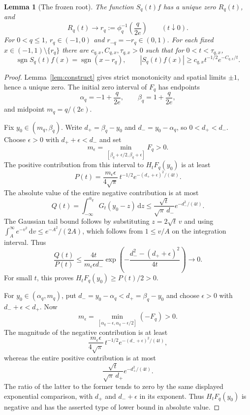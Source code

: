 \documentclass[11pt,reqno]{amsart}
\numberwithin{equation}{section}
\newtheorem{lemma}[theorem]{Lemma}
\theoremstyle{definition}
\theoremstyle{remark}
\newcommand{\sgn}{\operatorname{sgn}}
\newcommand{\dd}{\,\mathrm d}
\begin{document}
\begin{lemma}[The frozen root]\label{lem:frozen}
The function $S_q(t)f$ has a unique zero $R_q(t)$, and
\begin{equation}\label{eq:rootlimit}
 R_q(t)\longrightarrow r_q:=\phi_q^{-1}\left(\frac{q}{2e}\right)
 \qquad(t\downarrow0).
\end{equation}
For $0<q\leq1$, $r_q\in(-1,0)$ and $r_{-q}=-r_q\in(0,1)$. For each fixed $x\in(-1,1)\setminus\{r_q\}$ there are $c_{q,x},C_{q,x},\tau_{q,x}>0$ such that for $0<t<\tau_{q,x}$,
\begin{equation}\label{eq:signal}
 \sgn S_q(t)f(x)=\sgn(x-r_q),\qquad
 |S_q(t)f(x)|\geq c_{q,x}t^{-1/2}e^{-C_{q,x}/t}.
\end{equation}
\end{lemma}
\begin{proof}
Lemma~\ref{lem:construct} gives strict monotonicity and spatial limits $\pm1$, hence a unique zero. The initial zero interval of $F_q$ has endpoints
\[
 \alpha_q=-1+\frac q{2e},\qquad
 \beta_q=1+\frac q{2e},
\]
and midpoint $m_q=q/(2e)$.

Fix $y_0\in(m_q,\beta_q)$. Write $d_+=\beta_q-y_0$ and $d_-=y_0-\alpha_q$, so $0<d_+<d_-$. Choose $\epsilon>0$ with $d_++\epsilon<d_-$ and set
\[
 m_\epsilon=\min_{[\beta_q+\epsilon/2,\beta_q+\epsilon]}F_q>0.
\]
The positive contribution from this interval to $H_tF_q(y_0)$ is at least
\[
 P(t)=\frac{m_\epsilon\epsilon}{4\sqrt\pi}\,
 t^{-1/2}e^{-(d_++\epsilon)^2/(4t)}.
\]
The absolute value of the entire negative contribution is at most
\[
 Q(t)=\int_{-\infty}^{\alpha_q}G_t(y_0-z)\dd z
 \leq\frac{\sqrt t}{\sqrt\pi\,d_-}e^{-d_-^2/(4t)}.
\]
The Gaussian tail bound follows by substituting $z=2\sqrt t\,v$ and using $\int_A^\infty e^{-v^2}\dd v\leq e^{-A^2}/(2A)$, which follows from $1\leq v/A$ on the integration interval. Thus
\[
 \frac{Q(t)}{P(t)}
 \leq\frac{4t}{m_\epsilon\epsilon d_-}
 \exp\left(-\frac{d_-^2-(d_++\epsilon)^2}{4t}\right)\longrightarrow0.
\]
For small $t$, this proves $H_tF_q(y_0)\geq P(t)/2>0$.

For $y_0\in(\alpha_q,m_q)$, put $d_-=y_0-\alpha_q<d_+=\beta_q-y_0$ and choose $\epsilon>0$ with $d_-+\epsilon<d_+$. Now
\[
 m_\epsilon=\min_{[\alpha_q-\epsilon,\alpha_q-\epsilon/2]}(-F_q)>0.
\]
The magnitude of the negative contribution is at least
\[
 \frac{m_\epsilon\epsilon}{4\sqrt\pi}\,
 t^{-1/2}e^{-(d_-+\epsilon)^2/(4t)},
\]
whereas the entire positive contribution is at most
\[
 \frac{\sqrt t}{\sqrt\pi\,d_+}e^{-d_+^2/(4t)}.
\]
The ratio of the latter to the former tends to zero by the same displayed exponential comparison, with $d_+$ and $d_-+\epsilon$ in its exponent. Thus $H_tF_q(y_0)$ is negative and has the asserted type of lower bound in absolute value.


\end{proof}
\end{document}
